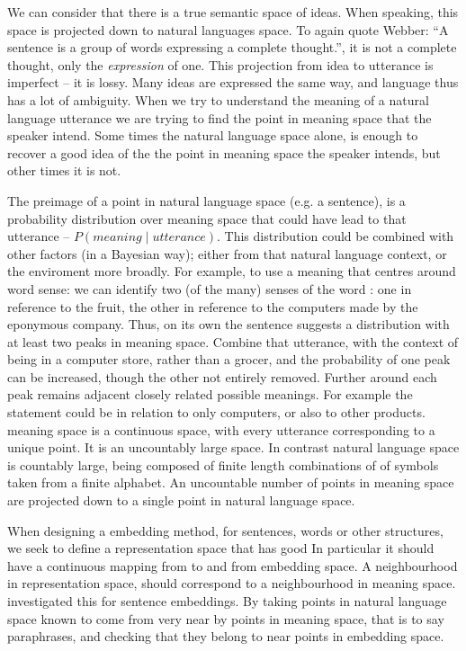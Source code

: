 \documentclass{book}
\begin{document}
We can consider that there is a true semantic space of ideas.
When speaking, this space is projected down to natural languages space.
To again quote Webber: ``A sentence is a group of words expressing a complete thought.'', it is not a complete thought, only the \emph{expression} of one.
This projection from idea to utterance is imperfect -- it is lossy.
Many ideas are expressed the same way, and language thus has a lot of ambiguity.
When we try to understand the meaning of a natural language utterance we are trying to find the point in meaning space that the speaker intend.
Some times the natural language space alone, is enough to recover a good idea of the the point in meaning space the speaker intends,
but other times it is not.

The preimage of a point in natural language space (e.g. a sentence),
is a probability distribution over meaning space that could have lead to that utterance -- $P(meaning \mid utterance)$.
This distribution could be combined with other factors (in a Bayesian way); either from that natural language context, or the enviroment more broadly.
For example, to use a meaning that centres around word sense:
we can identify two (of the many) senses of the word :
one in reference to the fruit, the other in reference to the computers made by the eponymous company.
Thus, on its own the sentence 
suggests a distribution with at least two peaks in meaning space.
Combine that utterance, with the context of being in a computer store, rather than a grocer, and the probability of one peak can be increased, though  the other not entirely removed.
Further around each peak remains adjacent closely related possible meanings.
For example the statement could be in relation to only computers, or also to other products.
meaning space is a continuous space, with every utterance corresponding to a unique point. It is an uncountably large space.
In contrast natural language space is countably large, being composed of finite length combinations of of symbols taken from a finite alphabet.
An uncountable number of points in meaning space are projected down to a single point in natural language space.


When designing a embedding method, for sentences, words or other structures,
we seek to define a representation space
that has good 
In particular it should have a continuous mapping from to and from embedding space.
A neighbourhood in representation space, should correspond to a neighbourhood in meaning space.
 investigated this for sentence embeddings.
By taking points in natural language space known to come from very near by points in meaning space, that is to say paraphrases,
and checking that they belong to near points in embedding space.
\end{document}
